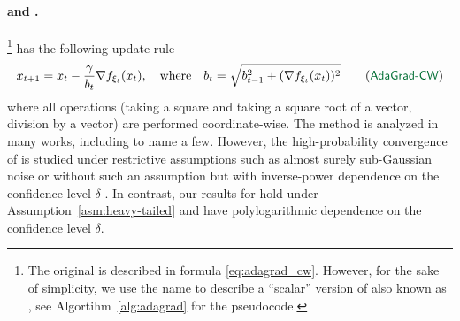 \documentclass{article}
\begin{document}
\paragraph{{} {\color{black}and} {}.} \footnote{The original  is described in formula \eqref{eq:adagrad_cw}. However, for the sake of simplicity, we use the name  to describe a ``scalar'' version of  also known as  \citep{ward2020adagrad}, see Algortihm~\ref{alg:adagrad} for the pseudocode.} \citep{streeter2010less, duchi2011adaptive} has the following update-rule
\begin{gather}
    x_{t+1} = x_t - \frac{\gamma}{b_t}\nabla f_{\xi_t}(x_t),\quad \text{where}\quad  b_t = \sqrt{b_{t-1}^2 + (\nabla f_{\xi_t}(x_t))^2} \tag{\algname{AdaGrad-CW}} \label{eq:adagrad_cw}
\end{gather}
where all operations (taking a square and taking a square root of a vector, division by a vector) are performed coordinate-wise. The method is analyzed in many works, including \citep{streeter2010less, duchi2011adaptive, zou2018weighted, chen2018convergence, ward2020adagrad, defossez2022simple, faw2022power} to name a few. However, the high-probability convergence of  is studied under restrictive assumptions such as almost surely sub-Gaussian noise \citep{li2020high, liu2023high} or without such an assumption but with inverse-power dependence on the confidence level $\delta$ \citep{wang2023convergence}. In contrast, our results for  hold under Assumption~\ref{asm:heavy-tailed} and have polylogarithmic dependence on the confidence level $\delta$.
\end{document}
